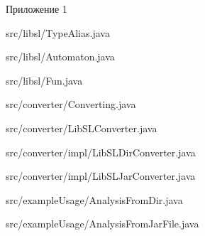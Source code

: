 
\newpage
\begin{flushright}
Приложение 1
\end{flushright}




{src/libsl/TypeAlias.java}


{src/libsl/Automaton.java}


{src/libsl/Fun.java}


{src/converter/Converting.java}


{src/converter/LibSLConverter.java}


{src/converter/impl/LibSLDirConverter.java}


{src/converter/impl/LibSLJarConverter.java}


{src/exampleUsage/AnalysisFromDir.java}


{src/exampleUsage/AnalysisFromJarFile.java}
